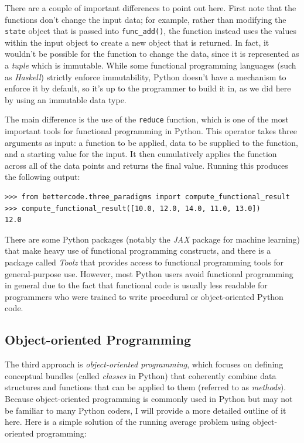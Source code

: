 

There are a couple of important differences to point out here.  First note that the functions don't change the input data; for example, rather than modifying the \texttt{state} object that is passed into \texttt{func\_add()}, the function instead uses the values within the input object to create a new object that is returned.  In fact, it wouldn't be possible for the function to change the data, since it is represented as a \textit{tuple} which is immutable.  While some functional programming languages (such as \textit{Haskell}) strictly enforce immutability, Python doesn't have a mechanism to enforce it by default, so it's up to the programmer to build it in, as we did here by using an immutable data type.

The main difference is the use of the \texttt{reduce} function, which is one of the most important tools for functional programming in Python.  This operator takes three arguments as input: a function to be applied, data to be supplied to the function, and a starting value for the input.  It then cumulatively applies the function across all of the data points and returns the final value.
Running this produces the following output:

\begin{lstlisting}[style=replshort]
>>> from bettercode.three_paradigms import compute_functional_result
>>> compute_functional_result([10.0, 12.0, 14.0, 11.0, 13.0])
12.0
\end{lstlisting}

There are some Python packages (notably the \textit{JAX} package for machine learning) that make heavy use of functional programming constructs, and there is a package called \textit{Toolz} that provides access to functional programming tools for general-purpose use. However, most Python users avoid functional programming in general due to the fact that functional code is usually less readable for programmers who were trained to write procedural or object-oriented Python code.

\subsection{Object-oriented Programming}

The third approach is \textit{object-oriented programming}, which focuses on defining conceptual bundles (called \textit{classes} in Python) that coherently combine data structures and functions that can be applied to them (referred to as \textit{methods}). Because object-oriented programming is commonly used in Python but may not be familiar to many Python coders, I will provide a more detailed outline of it here.  Here is a simple solution of the running average problem using object-oriented programming:

